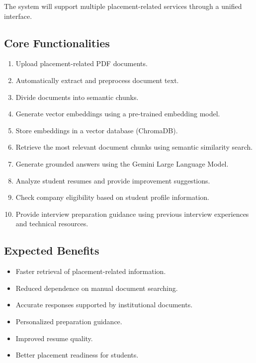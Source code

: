 \documentclass[11pt]{article}
\begin{document}
The system will support multiple placement-related services through a unified interface.

\subsection{Core Functionalities}

\begin{enumerate}

\item Upload placement-related PDF documents.

\item Automatically extract and preprocess document text.

\item Divide documents into semantic chunks.

\item Generate vector embeddings using a pre-trained embedding model.

\item Store embeddings in a vector database (ChromaDB).

\item Retrieve the most relevant document chunks using semantic similarity search.

\item Generate grounded answers using the Gemini Large Language Model.

\item Analyze student resumes and provide improvement suggestions.

\item Check company eligibility based on student profile information.

\item Provide interview preparation guidance using previous interview experiences and technical resources.

\end{enumerate}

\subsection{Expected Benefits}

\begin{itemize}

\item Faster retrieval of placement-related information.

\item Reduced dependence on manual document searching.

\item Accurate responses supported by institutional documents.

\item Personalized preparation guidance.

\item Improved resume quality.

\item Better placement readiness for students.

\end{itemize}
\end{document}

